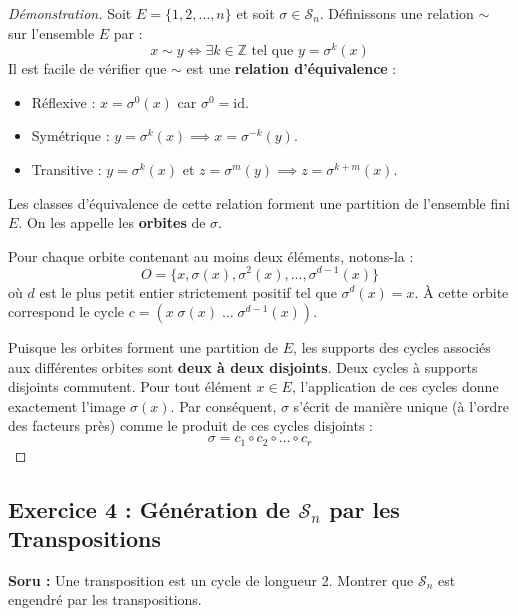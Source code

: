 \documentclass[12pt,a4paper]{report}
\begin{document}
\begin{proof}[Démonstration]
Soit $E = \{1, 2, \dots, n\}$ et soit $\sigma \in \mathcal{S}_n$.  
Définissons une relation $\sim$ sur l'ensemble $E$ par :
\[ x \sim y \iff \exists k \in \mathbb{Z} \text{ tel que } y = \sigma^k(x) \]
Il est facile de vérifier que $\sim$ est une \textbf{relation d'équivalence} :
\begin{itemize}
    \item Réflexive : $x = \sigma^0(x)$ car $\sigma^0 = \mathrm{id}$.
    \item Symétrique : $y = \sigma^k(x) \implies x = \sigma^{-k}(y)$.
    \item Transitive : $y = \sigma^k(x)$ et $z = \sigma^m(y) \implies z = \sigma^{k+m}(x)$.
\end{itemize}
Les classes d'équivalence de cette relation forment une partition de l'ensemble fini $E$. On les appelle les \textbf{orbites} de $\sigma$.

Pour chaque orbite contenant au moins deux éléments, notons-la :
\[ O = \{x, \sigma(x), \sigma^2(x), \dots, \sigma^{d-1}(x)\} \]
où $d$ est le plus petit entier strictement positif tel que $\sigma^d(x) = x$.  
À cette orbite correspond le cycle $c = (x \; \sigma(x) \; \dots \; \sigma^{d-1}(x))$.

Puisque les orbites forment une partition de $E$, les supports des cycles associés aux différentes orbites sont \textbf{deux à deux disjoints}.  
Deux cycles à supports disjoints commutent. Pour tout élément $x \in E$, l'application de ces cycles donne exactement l'image $\sigma(x)$.  
Par conséquent, $\sigma$ s'écrit de manière unique (à l'ordre des facteurs près) comme le produit de ces cycles disjoints :
\[ \sigma = c_1 \circ c_2 \circ \dots \circ c_r \]
\end{proof}

\vspace{0.5cm}

\subsection*{Exercice 4 : Génération de $\mathcal{S}_n$ par les Transpositions}
\textbf{Soru :} Une transposition est un cycle de longueur 2. Montrer que $\mathcal{S}_n$ est engendré par les transpositions.
\end{document}
